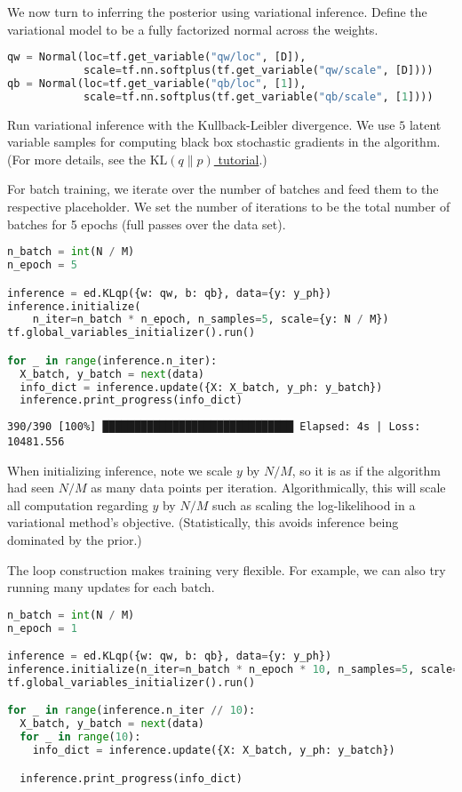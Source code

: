 We now turn to inferring the posterior using variational inference.
Define the variational model to be a fully factorized normal across
the weights.
\begin{lstlisting}[language=Python]
qw = Normal(loc=tf.get_variable("qw/loc", [D]),
            scale=tf.nn.softplus(tf.get_variable("qw/scale", [D])))
qb = Normal(loc=tf.get_variable("qb/loc", [1]),
            scale=tf.nn.softplus(tf.get_variable("qb/scale", [1])))
\end{lstlisting}

Run variational inference with the Kullback-Leibler divergence.
We use $5$ latent variable samples for computing
black box stochastic gradients in the algorithm.
(For more details, see the
\href{/tutorials/klqp}{$\text{KL}(q\|p)$ tutorial}.)

For batch training, we iterate over the number of batches and
feed them to the respective placeholder. We set the number of
iterations to be the total number of batches for 5 epochs
(full passes over the data set).

\begin{lstlisting}[language=Python]
n_batch = int(N / M)
n_epoch = 5

inference = ed.KLqp({w: qw, b: qb}, data={y: y_ph})
inference.initialize(
    n_iter=n_batch * n_epoch, n_samples=5, scale={y: N / M})
tf.global_variables_initializer().run()

for _ in range(inference.n_iter):
  X_batch, y_batch = next(data)
  info_dict = inference.update({X: X_batch, y_ph: y_batch})
  inference.print_progress(info_dict)
\end{lstlisting}

\begin{lstlisting}
390/390 [100%] ██████████████████████████████ Elapsed: 4s | Loss: 10481.556
\end{lstlisting}

When initializing inference, note we scale $y$ by $N/M$, so it is as if the
algorithm had seen $N/M$ as many data points per iteration.
Algorithmically, this will scale all computation regarding $y$ by
$N/M$ such as scaling the log-likelihood in a variational method's
objective. (Statistically, this avoids inference being dominated by the prior.)

The loop construction makes training very flexible. For example, we
can also try running many updates for each batch.

\begin{lstlisting}[language=Python]
n_batch = int(N / M)
n_epoch = 1

inference = ed.KLqp({w: qw, b: qb}, data={y: y_ph})
inference.initialize(n_iter=n_batch * n_epoch * 10, n_samples=5, scale={y: N / M})
tf.global_variables_initializer().run()

for _ in range(inference.n_iter // 10):
  X_batch, y_batch = next(data)
  for _ in range(10):
    info_dict = inference.update({X: X_batch, y_ph: y_batch})

  inference.print_progress(info_dict)
\end{lstlisting}

